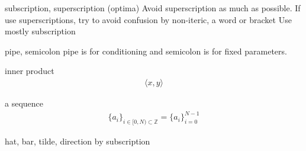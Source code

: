 \documentclass[dvipdfmx]{article}
\begin{document}
subscription, superscription (optima)
Avoid superscription as much as possible.
If use superscriptions, try to avoid confusion
by non-iteric, a word or bracket
Use mostly subscription

pipe, semicolon
pipe is for conditioning and
semicolon is for fixed parameters.

inner product
\begin{equation}
\begin{aligned}
  \langle x, y \rangle
\end{aligned}
\end{equation}

a sequence
\begin{equation}
\begin{aligned}
  \{a_i\}_{i \in [0, N) \subset \mathbb{Z}}
  = \{a_i\}_{i=0}^{N - 1}
\end{aligned}
\end{equation}

hat, bar, tilde, direction by subscription




\end{document}
